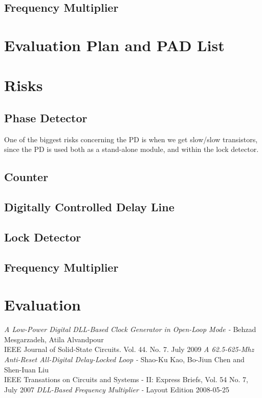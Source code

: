 \documentclass[a4paper,12pt]{article} \usepackage{graphicx}
\begin{document}
\clearpage

\subsection{Frequency Multiplier}

\section{Evaluation Plan and PAD List}

\section{Risks}
\subsection{Phase Detector}
One of the biggest risks concerning the PD is when we get
slow/slow transistors, since the PD is used both as a stand-alone
module, and within the lock detector.
\subsection{Counter}
\subsection{Digitally Controlled Delay Line}
\subsection{Lock Detector}
\subsection{Frequency Multiplier}

\section{Evaluation}

\newpage
\appendix 
\newpage

\begin{thebibliography}{99}
        \textit{A Low-Power Digital DLL-Based Clock Generator in Open-Loop Mode - }
                Behzad Mesgarzadeh, Atila Alvandpour \\
                IEEE Journal of Solid-State Circuits. Vol. 44. No. 7. July 2009
        \textit{A 62.5-625-Mhz Anti-Reset All-Digital Delay-Locked Loop - }
                Shao-Ku Kao, Bo-Jiun Chen and Shen-Iuan Liu \\
                IEEE Transations on Circuits and Systems - II: Express Briefs, Vol. 54 No. 7, July 2007
        \textit{DLL-Based Frequency Multiplier - }
                Layout Edition 2008-05-25 

\end{thebibliography}
\end{document}
